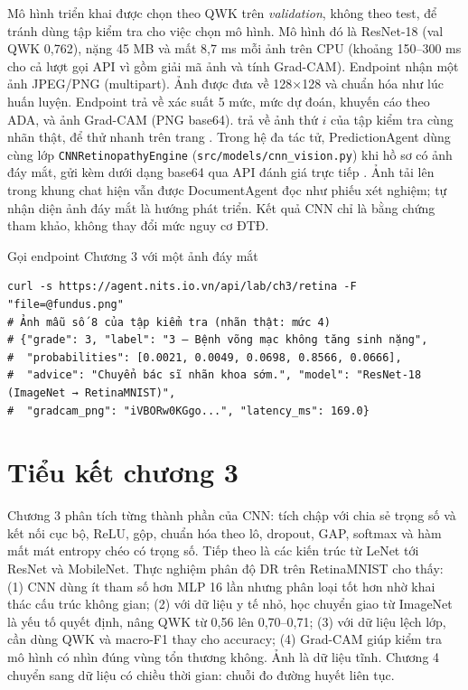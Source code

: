 Mô hình triển khai được chọn theo QWK trên \emph{validation}, không theo test, để tránh dùng tập kiểm tra cho việc chọn mô hình. Mô hình đó là ResNet-18 (val QWK 0,762), nặng 45 MB và mất 8,7 ms mỗi ảnh trên CPU (khoảng 150–300 ms cho cả lượt gọi API vì gồm giải mã ảnh và tính Grad-CAM). Endpoint  nhận một ảnh JPEG/PNG (multipart). Ảnh được đưa về 128×128 và chuẩn hóa như lúc huấn luyện. Endpoint trả về xác suất 5 mức, mức dự đoán, khuyến cáo theo ADA, và ảnh Grad-CAM (PNG base64).  trả về ảnh thứ $i$ của tập kiểm tra cùng nhãn thật, để thử nhanh trên trang . Trong hệ đa tác tử, PredictionAgent dùng cùng lớp \texttt{CNNRetinopathyEngine} (\texttt{src/models/cnn\_vision.py}) khi hồ sơ có ảnh đáy mắt, gửi kèm dưới dạng base64 qua API đánh giá trực tiếp . Ảnh tải lên trong khung chat hiện vẫn được DocumentAgent đọc như phiếu xét nghiệm; tự nhận diện ảnh đáy mắt là hướng phát triển. Kết quả CNN chỉ là bằng chứng tham khảo, không thay đổi mức nguy cơ ĐTĐ.

\begin{code}{Gọi endpoint Chương 3 với một ảnh đáy mắt}
\label{lst:ch3-api}
\begin{verbatim}
curl -s https://agent.nits.io.vn/api/lab/ch3/retina -F "file=@fundus.png"
# Ảnh mẫu số 8 của tập kiểm tra (nhãn thật: mức 4)
# {"grade": 3, "label": "3 – Bệnh võng mạc không tăng sinh nặng",
#  "probabilities": [0.0021, 0.0049, 0.0698, 0.8566, 0.0666],
#  "advice": "Chuyển bác sĩ nhãn khoa sớm.", "model": "ResNet-18 (ImageNet → RetinaMNIST)",
#  "gradcam_png": "iVBORw0KGgo...", "latency_ms": 169.0}
\end{verbatim}
\end{code}

\section{Tiểu kết chương 3}

Chương 3 phân tích từng thành phần của CNN: tích chập với chia sẻ trọng số và kết nối cục bộ, ReLU, gộp, chuẩn hóa theo lô, dropout, GAP, softmax và hàm mất mát entropy chéo có trọng số. Tiếp theo là các kiến trúc từ LeNet tới ResNet và MobileNet. Thực nghiệm phân độ DR trên RetinaMNIST cho thấy: (1) CNN dùng ít tham số hơn MLP 16 lần nhưng phân loại tốt hơn nhờ khai thác cấu trúc không gian; (2) với dữ liệu y tế nhỏ, học chuyển giao từ ImageNet là yếu tố quyết định, nâng QWK từ 0,56 lên 0,70–0,71; (3) với dữ liệu lệch lớp, cần dùng QWK và macro-F1 thay cho accuracy; (4) Grad-CAM giúp kiểm tra mô hình có nhìn đúng vùng tổn thương không. Ảnh là dữ liệu tĩnh. Chương 4 chuyển sang dữ liệu có chiều thời gian: chuỗi đo đường huyết liên tục.
